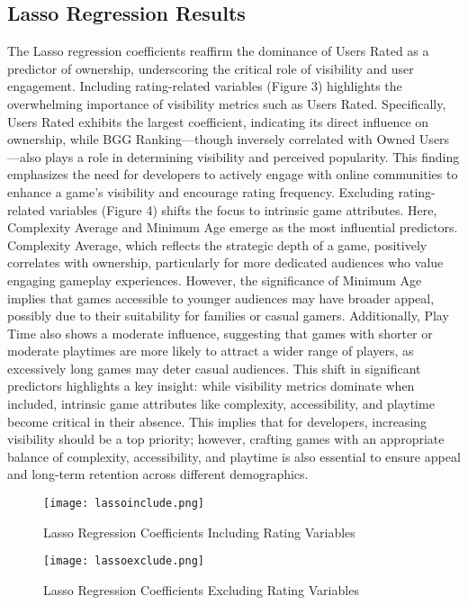 \documentclass{article}
\begin{document}
\subsection{Lasso Regression Results}
The Lasso regression coefficients reaffirm the dominance of Users Rated as a predictor of ownership, underscoring the critical role of visibility and user engagement. Including rating-related variables (Figure 3) highlights the overwhelming importance of visibility metrics such as Users Rated. Specifically, Users Rated exhibits the largest coefficient, indicating its direct influence on ownership, while BGG Ranking—though inversely correlated with Owned Users—also plays a role in determining visibility and perceived popularity. This finding emphasizes the need for developers to actively engage with online communities to enhance a game's visibility and encourage rating frequency. Excluding rating-related variables (Figure 4) shifts the focus to intrinsic game attributes. Here, Complexity Average and Minimum Age emerge as the most influential predictors. Complexity Average, which reflects the strategic depth of a game, positively correlates with ownership, particularly for more dedicated audiences who value engaging gameplay experiences. However, the significance of Minimum Age implies that games accessible to younger audiences may have broader appeal, possibly due to their suitability for families or casual gamers. Additionally, Play Time also shows a moderate influence, suggesting that games with shorter or moderate playtimes are more likely to attract a wider range of players, as excessively long games may deter casual audiences. This shift in significant predictors highlights a key insight: while visibility metrics dominate when included, intrinsic game attributes like complexity, accessibility, and playtime become critical in their absence. This implies that for developers, increasing visibility should be a top priority; however, crafting games with an appropriate balance of complexity, accessibility, and playtime is also essential to ensure appeal and long-term retention across different demographics. 
\begin{figure}[H]
\centering
\texttt{[image: lassoinclude.png]}
\caption{Lasso Regression Coefficients Including Rating Variables}
\label{fig:lasso_include}
\end{figure}

\begin{figure}[H]
\centering
\texttt{[image: lassoexclude.png]}
\caption{Lasso Regression Coefficients Excluding Rating Variables}
\label{fig:lasso_exclude}
\end{figure}
\end{document}
